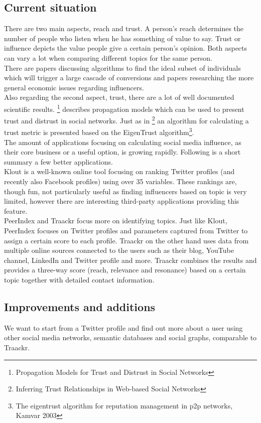 \subsection{Current situation}
There are two main aspects, reach and trust. A person's reach determines the number of people who listen when he has something of value to say. Trust or influence depicts the value people give a certain person's opinion. Both aspects can vary a lot when comparing different topics for the same person.\\
There are papers discussing algorithms to find the ideal subset of individuals which will trigger a large cascade of conversions and papers researching the more general economic issues regarding influencers.\\
Also regarding the second aspect, trust, there are a lot of well documented scientific results. \footnote{Propagation Models for Trust and Distrust in Social Networks} describes propagation models which can be used to present trust and distrust in social networks. Just as in \footnote{Inferring Trust Relationships in Web-based Social Networks} an algorithm for calculating a trust metric is presented based on the EigenTrust algorithm\footnote{The eigentrust algorithm for reputation management in p2p networks, Kamvar 2003}.\\
The amount of applications focusing on calculating social media influence, as their core business or a useful option, is growing rapidly. Following is a short summary a few better applications.\\
Klout is a well-known online tool focusing on ranking Twitter profiles (and recently also Facebook profiles) using over 35 variables. These rankings are, though fun, not particularly useful as finding influencers based on topic is very limited, however there are interesting third-party applications providing this feature.\\
PeerIndex and Traackr focus more on identifying topics. Just like Klout, PeerIndex focuses on Twitter profiles and parameters captured from Twitter to assign a certain score to each profile. Traackr on the other hand uses data from multiple online sources connected to the users such as their blog, YouTube channel, LinkedIn and Twitter profile and more. Traackr combines the results and provides a three-way score (reach, relevance and resonance) based on a certain topic together with detailed contact information.

\subsection{Improvements and additions}
We want to start from a Twitter profile and find out more about a user using other social media networks, semantic databases and social graphs, comparable to Traackr.

